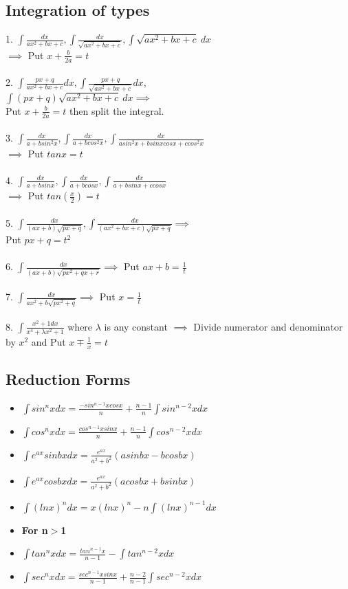 \documentclass[twocolumn, 10pt]{article}
\begin{document}
\subsection{Integration of types}
1. $\int \frac{dx}{ax^2+bx+c},\int \frac{dx}{\sqrt{ax^2+bx+c}},\int \sqrt{ax^2+bx+c} \medspace dx$\\ $\implies$ Put $x+\frac{b}{2a}=t$\\ \\
2. $\int \frac{px+q}{ax^2+bx+c}dx,\int \frac{px+q}{\sqrt{ax^2+bx+c}}dx$,\\$\int(px+q)\sqrt{ax^2+bx+c} \medspace dx \implies$ \\
Put $x+\frac{b}{2a}=t$ then split the integral. \\ \\
3. $\int \frac{dx}{a+bsin^2x}, \int \frac{dx}{a+bcos^2x},\int \frac{dx}{asin^2x+bsinxcosx+ccos^2x}$ \\
$\implies$ Put $tanx=t$ \\ \\
4. $\int \frac{dx}{a+bsinx}, \int \frac{dx}{a+bcosx},\int \frac{dx}{a+bsinx+ccosx}$ \\
$\implies$ Put $tan(\frac{x}{2})=t$ \\ \\
5. $\int \frac{dx}{(ax+b)\sqrt{px+q}},\int \frac{dx}{(ax^2+bx+c)\sqrt{px+q}} \implies$ \\
Put $px+q=t^2$ \\\\
6. $\int \frac{dx}{(ax+b)\sqrt{px^2+qx+r}} \implies$ Put $ax+b=\frac{1}{t}$ \\\\
7. $\int \frac{dx}{ax^2+b\sqrt{px^2+q}} \implies$ Put $x=\frac{1}{t}$ \\\\
8. $\int \frac{x^2+1dx}{x^4+\lambda x^2+1}$ where $\lambda$ is any constant $\implies$ Divide numerator and denominator by $x^2$ and Put $x \mp \frac{1}{x}=t$
\subsection{Reduction Forms}
\begin{itemize}
\item $\int sin^{n}xdx= \frac{-sin^{n-1}xcosx}{n}+ \frac{n-1}{n} \int sin^{n-2}xdx$ 
\item $\int cos^{n}xdx= \frac{cos^{n-1}xsinx}{n}+ \frac{n-1}{n} \int cos^{n-2}xdx$
\item $\int e^{ax}sinbxdx = \frac{e^{ax}}{a^2+b^2}(asinbx-bcosbx)$
\item $\int e^{ax}cosbxdx = \frac{e^{ax}}{a^2+b^2}(acosbx+bsinbx)$
\item $\int (lnx)^{n}dx = x(lnx)^{n} -n \int (lnx)^{n-1}dx$
\item \textbf{For n$>$1} 
\item $\int tan^{n}xdx= \frac{tan^{n-1}x}{n-1}- \int tan^{n-2}xdx$ 
\item $\int sec^{n}xdx= \frac{sec^{n-1}xsinx}{n-1}+ \frac{n-2}{n-1} \int sec^{n-2}xdx$ 
\end{itemize}
\end{document}

